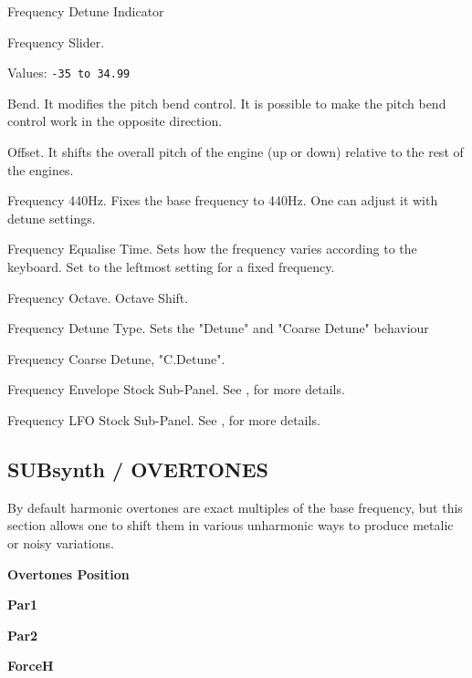    \setcounter{ItemCounter}{0}      %

   Frequency Detune Indicator

   Frequency Slider.

   Values: \texttt{-35 to 34.99}

   Bend.
   It modifies the pitch bend control.  It is possible to make the pitch bend
   control work in the opposite direction.

   Offset.
   It shifts the overall pitch of the engine (up or down) relative to the rest
   of the engines.

   Frequency 440Hz.
   Fixes the base frequency to 440Hz.
   One can adjust it with detune settings.

   Frequency Equalise Time.
   Sets how the frequency varies according to the keyboard.
   Set to the leftmost setting for a fixed frequency.

   Frequency Octave.
   Octave Shift.

   Frequency Detune Type.
   Sets the "Detune" and "Coarse Detune" behaviour

   Frequency Coarse Detune, "C.Detune".

   Frequency Envelope Stock Sub-Panel.
   See , for more details.

   Frequency LFO Stock Sub-Panel.
   See , for more details.


\subsection{SUBsynth / OVERTONES}
\label{subsec:subsynth_overtones}
   By default harmonic overtones are exact multiples of the base frequency, but
   this section allows one to shift them in various unharmonic ways to produce
   metalic or noisy variations.
   \begin{enumber}
      \item \textbf{Overtones Position}
      \item \textbf{Par1}
      \item \textbf{Par2}
      \item \textbf{ForceH}
   \end{enumber}

